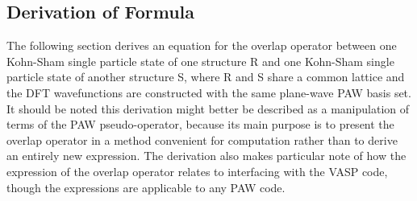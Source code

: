 \documentclass[12pt]{article}
\begin{document}
\subsection{Derivation of Formula}

The following section derives an equation for the overlap operator between one
Kohn-Sham single particle state of one structure R and one Kohn-Sham single
particle state of another structure S, where R and S share a common lattice
and the DFT wavefunctions are constructed with the same plane-wave PAW basis set.
It should be noted this derivation might better be described as a manipulation
of terms of the PAW pseudo-operator, because its main purpose is to present
the overlap operator in a method convenient for computation rather than to derive
an entirely new expression. The derivation also makes particular note of how
the expression of the overlap operator relates to interfacing with the VASP code,
though the expressions are applicable to any PAW code.
\end{document}
